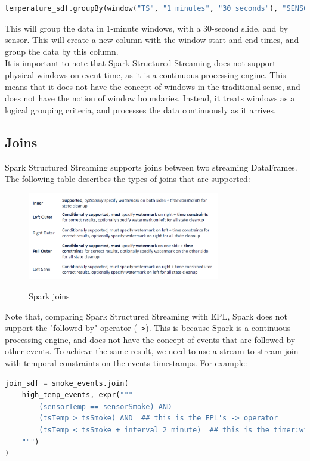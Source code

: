 \begin{lstlisting}[language=Python]
temperature_sdf.groupBy(window("TS", "1 minutes", "30 seconds"), "SENSOR")
\end{lstlisting}

This will group the data in 1-minute windows, with a 30-second slide, and by sensor. This will
create a new column with the window start and end times, and group the data by this column.\\

It is important to note that Spark Structured Streaming does not support physical windows on event time,
as it is a continuous processing engine. This means that it does not have the concept of windows in the
traditional sense, and does not have the notion of window boundaries. Instead, it treats windows as a
logical grouping criteria, and processes the data continuously as it arrives.

\subsection{Joins}

Spark Structured Streaming supports joins between two streaming DataFrames. The following table describes
the types of joins that are supported:

\begin{figure}[H]
    \centering
    \includegraphics[width=0.75\textwidth]{figures/spark_joins.png}
    \label{fig:spark_joins}
    \caption{Spark joins}
\end{figure}

Note that, comparing Spark Structured Streaming with EPL, Spark does not support the "followed by"
operator (\texttt{->}). This is because Spark is a continuous processing engine, and does not have the
concept of events that are followed by other events. To achieve the same result, we need to use a 
stream-to-stream join with temporal constraints on the events timestamps. For example:\\

\begin{lstlisting}[language=Python]
join_sdf = smoke_events.join(
    high_temp_events, expr("""
        (sensorTemp == sensorSmoke) AND
        (tsTemp > tsSmoke) AND  ## this is the EPL's -> operator
        (tsTemp < tsSmoke + interval 2 minute)  ## this is the timer:within clause
    """)
)
\end{lstlisting}

